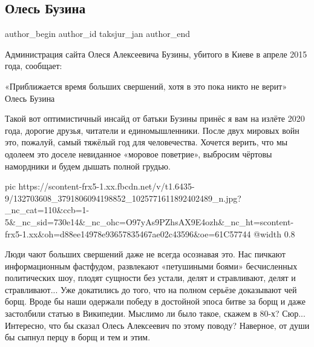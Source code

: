  
 
 
 
 
 
\subsection{Олесь Бузина}
\label{sec:23_12_2020.fb.taksjur_jan.1.oles_buzina}
 
\ifcmt
 author_begin
   author_id taksjur_jan
 author_end
\fi

Администрация сайта Олеся Алексеевича Бузины, убитого в Киеве в апреле 2015
года, сообщает:


«Приближается время больших свершений, хотя в это пока никто не верит»
Олесь Бузина

Такой вот оптимистичный инсайд от батьки Бузины принёс я вам на излёте 2020
года, дорогие друзья, читатели и единомышленники. После двух мировых войн это,
пожалуй, самый тяжёлый год для человечества. Хочется верить, что мы одолеем это
доселе невиданное «моровое поветрие», выбросим чёртовы намордники и будем
дышать полной грудью. 

\ifcmt
  pic https://scontent-frx5-1.xx.fbcdn.net/v/t1.6435-9/132703608_3791806094198852_1025771611892402489_n.jpg?_nc_cat=110&ccb=1-5&_nc_sid=730e14&_nc_ohc=O97yAs9PZhsAX9E4ozh&_nc_ht=scontent-frx5-1.xx&oh=d88ee14978e93657835467ae02c43596&oe=61C57744
  @width 0.8
\fi

Люди чают больших свершений даже не всегда осознавая это. Нас пичкают
информационным фастфудом, развлекают «петушиными боями» бесчисленных
политических шоу, плодят сущности без устали, делят и стравливают, делят и
стравливают... Уже докатились до того, что на полном серьёзе доказывают чей борщ.
Вроде бы наши одержали победу в достойной эпоса битве за борщ и даже застолбили
статью в Википедии. Мыслимо ли было такое, скажем в 80-х? Сюр... Интересно, что
бы сказал Олесь Алексеевич по этому поводу? Наверное, от души бы сыпнул перцу в
борщ и тем и этим.

